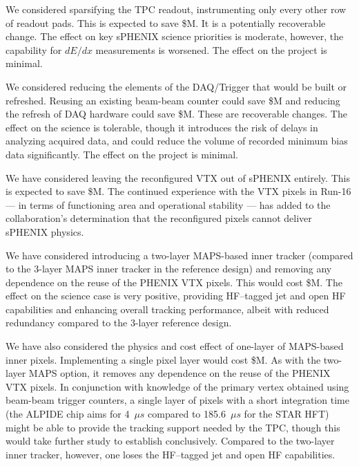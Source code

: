 We considered sparsifying the TPC readout, instrumenting only every
other row of readout pads.  This is expected to save
\${\reducedTPCreadout}M.  It is a potentially recoverable change. The
effect on key sPHENIX science priorities is moderate, however, the
capability for $dE/dx$ measurements is worsened.  The effect on the
project is minimal.

We considered reducing the elements of the DAQ/Trigger that would be
built or refreshed.  Reusing an existing beam-beam counter could save
\${\reuseBBC}M and reducing the refresh of DAQ hardware could save
\${\reducedDAQ}M.  These are recoverable changes.  The effect on the
science is tolerable, though it introduces the risk of delays in
analyzing acquired data, and could reduce the volume of recorded
minimum bias data significantly. The effect on the project is minimal.

We have considered leaving the reconfigured VTX out of sPHENIX
entirely.  This is expected to save \${\noVTX}M.  The continued experience
with the VTX pixels in Run-16 --- in terms of functioning area and
operational stability --- has added to the collaboration's
determination that the reconfigured pixels cannot deliver sPHENIX
physics. 

We have considered introducing a two-layer MAPS-based inner tracker
(compared to the 3-layer MAPS inner tracker in the reference design)
and removing any dependence on the reuse of the PHENIX VTX pixels.
This would cost \${\twoLayerMAPS}M.  The effect on the science case is very
positive, providing HF--tagged jet and open HF capabilities and enhancing
overall tracking performance, albeit
with reduced redundancy compared to the 3-layer reference design. 

We have also considered the physics and cost effect of one-layer of
MAPS-based inner pixels.  Implementing a single pixel layer would cost
\${\oneLayerMAPS}M.  As with the two-layer MAPS option, it removes any
dependence on the reuse of the PHENIX VTX pixels.  In conjunction with
knowledge of the primary vertex obtained using beam-beam trigger
counters, a single layer of pixels with a short integration time (the
ALPIDE chip aims for 4~$\mu s$ compared to 185.6~$\mu s$ for the STAR
HFT) might be able to provide the tracking support needed by the TPC,
though this would take further study to establish conclusively.
Compared to the two-layer inner tracker, however, one loses the
HF--tagged jet and open HF capabilities.







